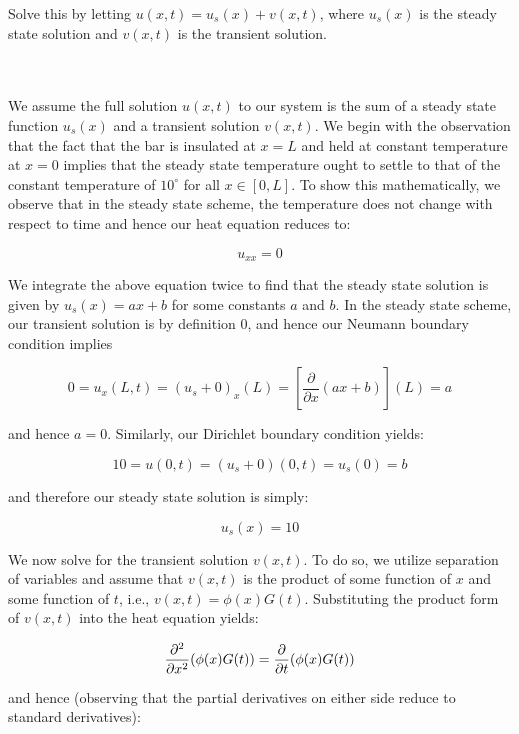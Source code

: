 Solve this by letting $u(x, t) = u_s(x) + v(x, t)$, where $u_s(x)$ is the steady state solution and $v(x, t)$ is the
transient solution.

\begin{solution}\ \\\\
    We assume the full solution $u(x, t)$ to our system is the sum of a steady state function $u_s(x)$ and a transient 
    solution $v(x, t)$. We begin with the observation that the fact that the bar is insulated at $x = L$ and held at
    constant temperature at $x = 0$ implies that the steady state temperature ought to settle to that of the constant
    temperature of $10^{\circ}$ for all $x \in [0, L]$. To show this mathematically, we observe that in the steady state
    scheme, the temperature does not change with respect to time and hence our heat equation reduces to:

    $$
    u_{xx} = 0
    $$

    We integrate the above equation twice to find that the steady state solution is given by $u_s(x) = ax + b$ for some
    constants $a$ and $b$. In the steady state scheme, our transient solution is by definition 0, and hence our Neumann
    boundary condition implies

    $$
    0 = u_x(L, t) = (u_s + 0)_x(L) = \left[\frac{\partial}{\partial x}(ax + b)\right](L) = a
    $$

    and hence $a = 0$. Similarly, our Dirichlet boundary condition yields:

    $$
    10 = u(0, t) = (u_s + 0)(0, t) = u_s(0) = b
    $$

    and therefore our steady state solution is simply:

    \begin{equation}
        u_s(x) = 10
    \end{equation}

    We now solve for the transient solution $v(x, t)$.  To do so, we utilize separation of variables and 
    assume that $v(x, t)$ is the product of some function of $x$ and some function of $t$, i.e., 
    $v(x, t) = \phi(x) G(t)$. Substituting the product form of $v(x, t)$ into the heat equation yields:

    $$
    \frac{\partial^2}{\partial x^2} (\phi(x) G(t)) = \frac{\partial}{\partial t} (\phi(x) G(t)) \\
    $$

    and hence (observing that the partial derivatives on either side reduce to standard derivatives):


\end{solution}
